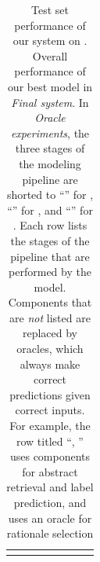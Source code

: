 \begin{table}[t]
\begin{tabularx}{\linewidth}{l *{3}{c} *{1}{c} *{3}{c}}
    \arrayrulecolor{black}\bottomrule
  \end{tabularx}

    \caption{Test set performance of our \sysname system on \ours. Overall performance of our best \sysname model in \emph{Final system}. In \emph{Oracle experiments}, the three stages of the modeling pipeline are shorted to ``\abst'' for \componentone, ``\rtnl'' for \componenttwo, and ``\lbl'' for \componentthree. Each row lists the stages of the pipeline that are performed by the \sysname model. Components that are \emph{not} listed are replaced by oracles, which always make correct predictions given correct inputs. For example, the row titled ``\abst, \lbl'' uses \sysname components for abstract retrieval and label prediction, and uses an oracle for rationale selection     }
    \label{tbl:main_results}


\end{table}
